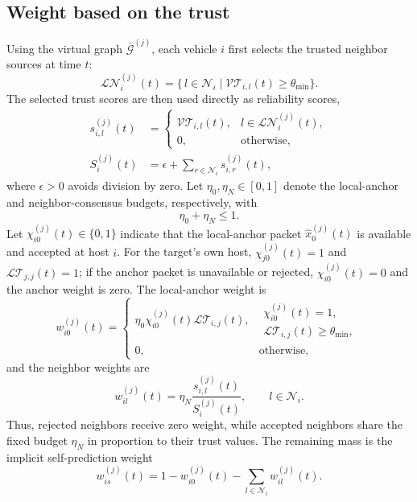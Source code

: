 \documentclass[letterpaper,journal]{IEEEtran}
\def\G{\mathcal{G}} %
\def\N{\mathcal{N}} %
\def\LT{\mathcal{LT}} %
\def\VT{\mathcal{VT}} %
\begin{document}
\subsection{Weight based on the trust}
Using the virtual graph $\bar{\G}^{(j)}$, each vehicle $i$ first selects the trusted neighbor sources at time $t$:
\begin{equation}
\mathcal{LN}^{(j)}_{i}(t)
= \Big\{\, l \in \N_i \;\big|\; \VT_{i,l}(t) \ge \theta_{\min} \Big\}.
\end{equation}
The selected trust scores are then used directly as reliability scores,
\begin{align}
s_{i,l}^{(j)}(t)
&=
\begin{cases}
\VT_{i,l}(t), & l\in\mathcal{LN}^{(j)}_{i}(t),\\
0, & \text{otherwise},
\end{cases}
\label{new_setneibor}\\
S_i^{(j)}(t)
&=\epsilon+\sum_{r\in\N_i}s_{i,r}^{(j)}(t),
\end{align}
where $\epsilon>0$ avoids division by zero. Let $\eta_0,\eta_N\in[0,1]$ denote the local-anchor and neighbor-consensus budgets, respectively, with
\begin{equation}
    \eta_0+\eta_N\le1 .
\end{equation}
Let $\chi_{i0}^{(j)}(t)\in\{0,1\}$ indicate that the local-anchor packet $\hat{x}_0^{(j)}(t)$ is available and accepted at host $i$. For the target's own host, $\chi_{j0}^{(j)}(t)=1$ and $\LT_{j,j}(t)=1$; if the anchor packet is unavailable or rejected, $\chi_{i0}^{(j)}(t)=0$ and the anchor weight is zero. The local-anchor weight is
\begin{equation}\label{eq_anchor_weight}
w_{i0}^{(j)}(t)=
\begin{cases}
\eta_0\chi_{i0}^{(j)}(t)\LT_{i,j}(t), &
\substack{\chi_{i0}^{(j)}(t)=1,\\ \LT_{i,j}(t)\ge\theta_{\min},}\\
0, & \text{otherwise},
\end{cases}
\end{equation}
and the neighbor weights are
\begin{equation}\label{design_gain}
    w_{il}^{(j)}(t)
    =
    \eta_N
    \frac{s_{i,l}^{(j)}(t)}
    {S_i^{(j)}(t)},
    \qquad l\in\N_i .
\end{equation}
Thus, rejected neighbors receive zero weight, while accepted neighbors share the fixed budget $\eta_N$ in proportion to their trust values. The remaining mass is the implicit self-prediction weight
\begin{equation}
    w_{is}^{(j)}(t)
    =
    1-w_{i0}^{(j)}(t)-\sum_{l\in\N_i}w_{il}^{(j)}(t).
\end{equation}
\end{document}
